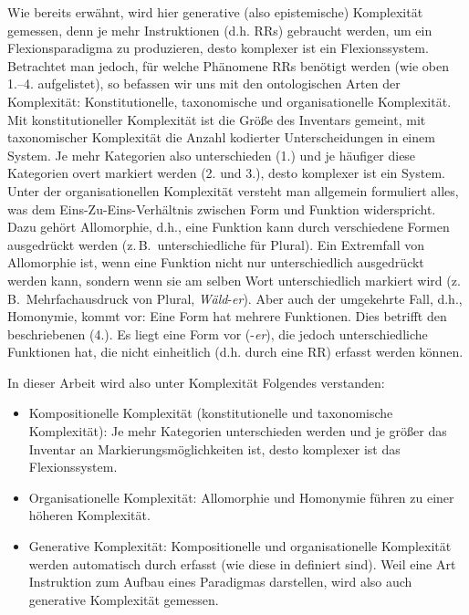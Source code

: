 Wie bereits erwähnt, wird hier generative (also epistemische) Komplexität gemessen, denn je mehr Instruktionen (d.h. RRs) gebraucht werden, um ein Flexionsparadigma zu produzieren, desto komplexer ist ein Flexionssystem. Betrachtet man jedoch, für welche Phänomene RRs benötigt werden (wie oben 1.–4. aufgelistet), so befassen wir uns mit den ontologischen Arten der Komplexität: Konstitutionelle, taxonomische und organisationelle Komplexität. Mit konstitutioneller Komplexität ist die Größe des Inventars gemeint, mit taxonomischer Komplexität die Anzahl kodierter Unterscheidungen in einem System. Je mehr Kategorien also unterschieden (1.) und je häufiger diese Kategorien overt markiert werden (2. und 3.), desto komplexer ist ein System. Unter der organisationellen Komplexität versteht man allgemein formuliert alles, was dem Eins-Zu-Eins-Verhältnis zwischen Form und Funktion widerspricht. Dazu gehört Allomorphie, d.h., eine Funktion kann durch verschiedene Formen ausgedrückt werden (z.\,B.\ unterschiedliche  für Plural). Ein Extremfall von Allomorphie ist, wenn eine Funktion nicht nur unterschiedlich ausgedrückt werden kann, sondern wenn sie am selben Wort unterschiedlich markiert wird (z.\,B.\ Mehrfachausdruck von Plural, \textit{Wäld}-\textit{er}). Aber auch der umgekehrte Fall, d.h., Homonymie, kommt vor: Eine Form hat mehrere Funktionen. Dies betrifft den beschriebenen  (4.). Es liegt eine Form vor (-\textit{er}), die jedoch unterschiedliche Funktionen hat, die nicht einheitlich (d.h. durch eine RR) erfasst werden können.

In dieser Arbeit wird also unter Komplexität Folgendes verstanden:

\begin{itemize}
\item 
Kompositionelle Komplexität (konstitutionelle und taxonomische Komplexität): Je mehr Kategorien unterschieden werden und je größer das Inventar an Markierungsmöglichkeiten ist, desto komplexer ist das Flexionssystem.
\item 
Organisationelle Komplexität: Allomorphie und Homonymie führen zu einer höheren Komplexität.
\item 
Generative Komplexität: Kompositionelle und organisationelle Komplexität werden automatisch durch  erfasst (wie diese in  definiert sind). Weil  eine Art Instruktion zum Aufbau eines Paradigmas darstellen, wird also auch generative Komplexität gemessen.
\end{itemize}

